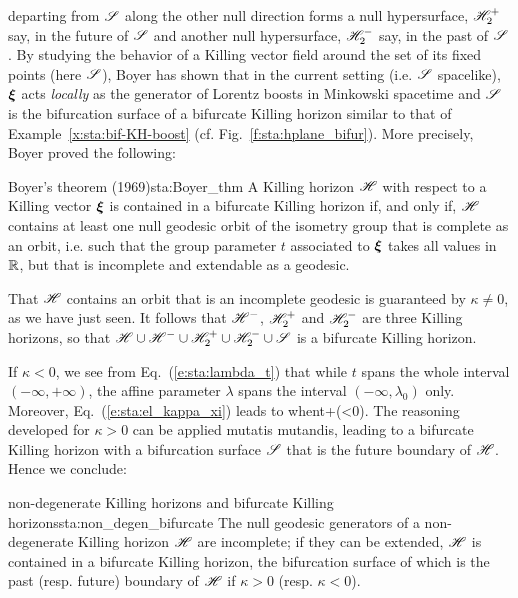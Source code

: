 departing from $\mathscr{S}$ along the other null direction forms a null hypersurface,
$\mathscr{H}_2^+$ say, in the future of $\mathscr{S}$ and another null hypersurface, $\mathscr{H}_2^-$
say, in the past of $\mathscr{S}$.
By studying the behavior of a Killing vector field around the set of its
fixed points (here $\mathscr{S}$), Boyer \cite{Boyer69} has shown that in
the current setting (i.e. $\mathscr{S}$ spacelike), $\bm{\xi}$ acts \emph{locally}
as the generator of Lorentz boosts in Minkowski spacetime and $\mathscr{S}$ is the bifurcation surface
of a bifurcate Killing horizon similar to that of Example~\ref{x:sta:bif-KH-boost}
(cf. Fig.~\ref{f:sta:hplane_bifur}).
More precisely, Boyer \cite{Boyer69}  proved the following:

\begin{tprop}{Boyer's theorem \textnormal{(1969)}}{sta:Boyer_thm}
A Killing horizon $\mathscr{H}$ with respect to a Killing vector $\bm{\xi}$
is contained in a bifurcate Killing horizon if, and
only if, $\mathscr{H}$ contains at least one null geodesic orbit of the isometry group that is
complete as an orbit, i.e. such that the group parameter $t$ associated to $\bm{\xi}$ takes
all values in $\mathbb{R}$, but that is incomplete and extendable as
a geodesic.
\end{tprop}

That $\mathscr{H}$ contains an orbit that is an incomplete geodesic is guaranteed by
$\kappa\not=0$, as we have just seen.
It follows that $\mathscr{H}^-$, $\mathscr{H}_2^+$ and $\mathscr{H}_2^-$
are three Killing horizons, so that $\mathscr{H}\cup\mathscr{H}^-\cup\mathscr{H}_2^+\cup\mathscr{H}_2^-\cup\mathscr{S}$
is a bifurcate Killing horizon.

If $\kappa<0$, we see from Eq.~(\ref{e:sta:lambda_t}) that while $t$ spans the
whole interval $(-\infty,+\infty)$, the affine parameter $\lambda$ spans the
interval $(-\infty,\lambda_0)$ only. Moreover, Eq.~(\ref{e:sta:el_kappa_xi})
leads to
\be
    \w{\xi}  \quad\mbox{when}\quad t\rightarrow +\infty  \qquad (\kappa<0).
\ee
The reasoning developed for $\kappa>0$ can be applied mutatis mutandis,
leading to a bifurcate Killing horizon with a bifurcation surface $\mathscr{S}$ that
is the future boundary of $\mathscr{H}$. Hence we conclude:
\begin{tprop}{non-degenerate Killing horizons and bifurcate Killing horizons}{sta:non_degen_bifurcate}
The null geodesic generators of a non-degenerate Killing horizon $\mathscr{H}$ are
incomplete; if they can be extended, $\mathscr{H}$ is contained in a
bifurcate Killing horizon, the bifurcation surface of which is the past
(resp. future) boundary of $\mathscr{H}$ if $\kappa>0$ (resp. $\kappa<0$).
\end{tprop}

